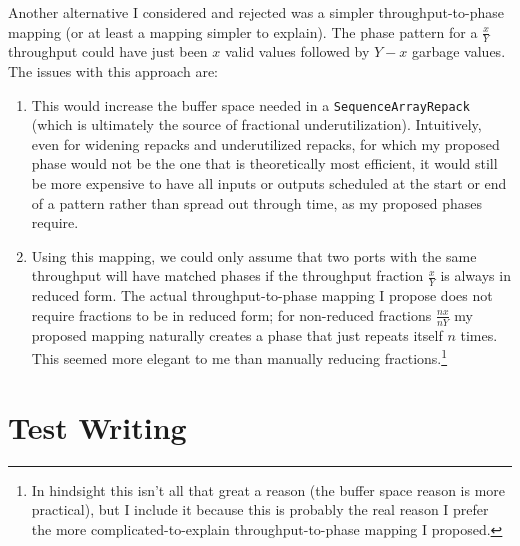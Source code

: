 \documentclass[12pt]{article}
\begin{document}
Another alternative I considered and rejected was a simpler
throughput-to-phase mapping (or at least a mapping simpler to
explain). The phase pattern for a $\frac{x}{Y}$ throughput could have
just been $x$ valid values followed by $Y-x$ garbage values.
The issues with this approach are:
\begin{enumerate}
\item This would increase the buffer space needed in a
  \texttt{SequenceArrayRepack} (which is ultimately the source of
  fractional underutilization). Intuitively, even for widening repacks
  and underutilized repacks, for which my proposed phase would not be
  the one that is theoretically most efficient, it would still be more
  expensive to have all inputs or outputs scheduled at the start or
  end of a pattern rather than spread out through time, as my proposed
  phases require.

\item Using this mapping, we could only assume that two ports with the
  same throughput will have matched phases if the throughput fraction
  $\frac{x}{Y}$ is always in reduced form. The actual
  throughput-to-phase mapping I propose does not require fractions to
  be in reduced form; for non-reduced fractions $\frac{nx}{nY}$ my
  proposed mapping naturally creates a phase that just repeats itself
  $n$ times. This seemed more elegant to me than manually reducing
  fractions.\footnote{In hindsight this isn't all that great a reason
    (the buffer space reason is more practical), but I include it
    because this is probably the real reason I prefer the more
    complicated-to-explain throughput-to-phase mapping I proposed.}
\end{enumerate}


\section{Test Writing}
\end{document}
